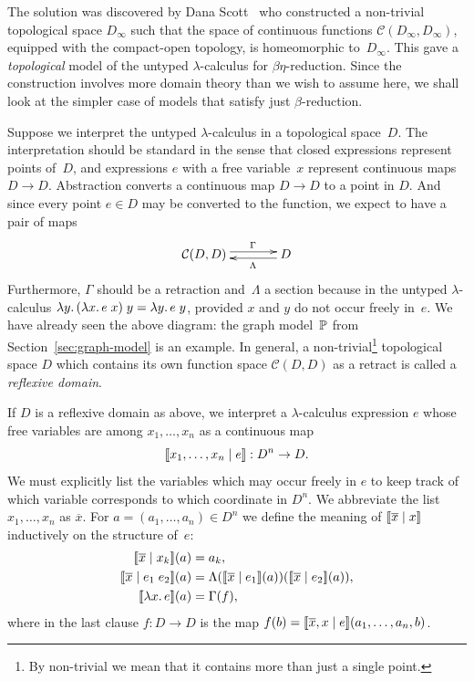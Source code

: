 The solution was discovered by Dana Scott~\cite{scott72:_contin_lattic} who
constructed a non-trivial topological space $D_\infty$ such that the
space of continuous functions $\mathcal{C}(D_\infty, D_\infty)$,
equipped with the compact-open topology, is homeomorphic
to~$D_\infty$. This gave a \emph{topological} model of the untyped
$\lambda$-calculus for $\beta\eta$-reduction. Since the construction
involves more domain theory than we wish to assume here, we shall look
at the simpler case of models that satisfy just $\beta$-reduction.

Suppose we interpret the untyped $\lambda$-calculus in a topological
space~$D$. The interpretation should be standard in the sense that
closed expressions represent points of~$D$, and expressions $e$ with a
free variable~$x$ represent continuous maps $D \to D$. Abstraction
converts a continuous map $D \to D$ to a point in $D$. And since every
point $e \in D$ may be converted to the function, we expect to have a
pair of maps
%
\begin{equation*}
  \xymatrix{
    **[l]{\mathcal{C}(D, D)}
    \ar@<+0.25em>[r]^{\Gamma}
    &
    {D}
    \ar@<+0.25em>[l]^{\Lambda}
  }
\end{equation*}
%
Furthermore, $\Gamma$ should be a retraction and~$\Lambda$ a section
because in the untyped $\lambda$-calculus
$\lambda y .\,(\lambda x .\,e\;x)\; y = \lambda y .\,e\;y$, provided $x$ and
$y$ do not occur freely in~$e$. We have already seen the above
diagram: the graph model~$\mathbb{P}$ from Section~\ref{sec:graph-model}
is an example. In general, a non-trivial\footnote{By non-trivial we
  mean that it contains more than just a single point.} topological
space $D$ which contains its own function space $\mathcal{C}(D,D)$ as
a retract is called a \emph{reflexive domain}.

If $D$ is a reflexive domain as above, we interpret a
$\lambda$-calculus expression $e$ whose free variables are among $x_1,
\ldots, x_n$ as a continuous map
%
\begin{equation*}
  [\![x_1, \ldots, x_n \mid e]\!] : D^n \to D.
\end{equation*}
%
We must explicitly list the variables which may occur freely in $e$ to
keep track of which variable corresponds to which coordinate in $D^n$.
We abbreviate the list $x_1, \ldots, x_n$ as $\overline{x}$. For $a = (a_1,
\ldots, a_n) \in D^n$ we define the meaning of $[\![\overline{x} \mid x]\!]$
inductively on the structure of~$e$:
%
\begin{align*}
  \sem{\overline{x} \ctx x_k}(a) &= a_k, \\
  \sem{\overline{x} \ctx e_1\; e_2}(a) &= 
  \Lambda(\sem{\overline{x} \ctx e_1}(a))(\sem{\overline{x} \ctx e_2}(a)), \\
  \sem{\xulam{x}{e}}(a) &= \Gamma(f),
\end{align*}
%
where in the last clause $f : D \to D$ is the map $f (b) =
[\![\overline{x}, x \mid e]\!](a_1, \ldots, a_n, b)$.

